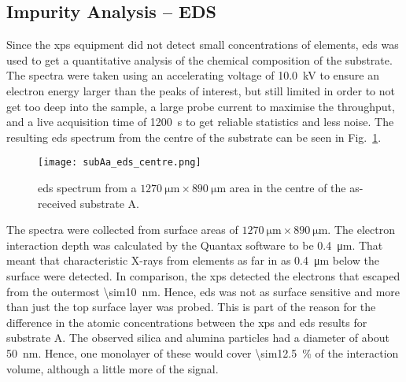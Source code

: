 \subsection{Impurity Analysis -- EDS}
Since the \ac{xps} equipment did not detect small concentrations of elements, \ac{eds} was used to get a quantitative analysis of the chemical composition of the substrate. The spectra were taken using an accelerating voltage of \SI{10.0}{\kilo\volt} to ensure an electron energy larger than the peaks of interest, but still limited in order to not get too deep into the sample, a large probe current to maximise the throughput, and a live acquisition time of \SI{1200}{\second} to get reliable statistics and less noise. The resulting \ac{eds} spectrum from the centre of the substrate can be seen in Fig.~\ref{fig:subAa_eds_centre}. %

\begin{figure}[htbp]
    \centering
    \texttt{[image: subAa\_eds\_centre.png]}
    \caption[\Ac{eds} spectrum from the centre of the as-received substrate A.]{\Ac{eds} spectrum from a $\SI{1270}{\micro\metre}\times\SI{890}{\micro\metre}$ area in the centre of the as-received substrate A.}
    \label{fig:subAa_eds_centre}
\end{figure}

The spectra were collected from surface areas of $\SI{1270}{\micro\metre}\times\SI{890}{\micro\metre}$. The electron interaction depth was calculated by the Quantax software to be \SI{0.4}{\micro\metre}. That meant that characteristic X-rays from elements as far in as \SI{0.4}{\micro\metre} below the surface were detected. In comparison, the \ac{xps} detected the electrons that escaped from the outermost \SI{\sim10}{\nano\metre}. Hence, \ac{eds} was not as surface sensitive and more than just the top surface layer was probed. This is part of the reason for the difference in the atomic concentrations between the \ac{xps} and \ac{eds} results for substrate A. The observed silica and alumina particles had a diameter of about \SI{50}{\nano\metre}. Hence, one monolayer of these would cover \SI{\sim12.5}{\percent} of the interaction volume, although a little more of the signal.

